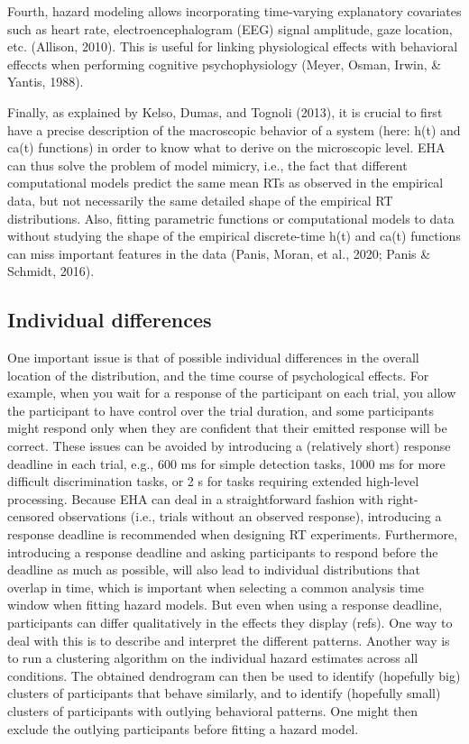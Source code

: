 \documentclass[
  man,floatsintext]{apa6}
\begin{document}
Fourth, hazard modeling allows incorporating time-varying explanatory covariates such as heart rate, electroencephalogram (EEG) signal amplitude, gaze location, etc. (Allison, 2010). This is useful for linking physiological effects with behavioral effeccts when performing cognitive psychophysiology (Meyer, Osman, Irwin, \& Yantis, 1988).

Finally, as explained by Kelso, Dumas, and Tognoli (2013), it is crucial to first have a precise description of the macroscopic behavior of a system (here: h(t) and ca(t) functions) in order to know what to derive on the microscopic level. EHA can thus solve the problem of model mimicry, i.e., the fact that different computational models predict the same mean RTs as observed in the empirical data, but not necessarily the same detailed shape of the empirical RT distributions. Also, fitting parametric functions or computational models to data without studying the shape of the empirical discrete-time h(t) and ca(t) functions can miss important features in the data (Panis, Moran, et al., 2020; Panis \& Schmidt, 2016).

\subsection{Individual differences}\label{individual-differences}

One important issue is that of possible individual differences in the overall location of the distribution, and the time course of psychological effects. For example, when you wait for a response of the participant on each trial, you allow the participant to have control over the trial duration, and some participants might respond only when they are confident that their emitted response will be correct. These issues can be avoided by introducing a (relatively short) response deadline in each trial, e.g., 600 ms for simple detection tasks, 1000 ms for more difficult discrimination tasks, or 2 s for tasks requiring extended high-level processing. Because EHA can deal in a straightforward fashion with right-censored observations (i.e., trials without an observed response), introducing a response deadline is recommended when designing RT experiments. Furthermore, introducing a response deadline and asking participants to respond before the deadline as much as possible, will also lead to individual distributions that overlap in time, which is important when selecting a common analysis time window when fitting hazard models.
But even when using a response deadline, participants can differ qualitatively in the effects they display (refs). One way to deal with this is to describe and interpret the different patterns. Another way is to run a clustering algorithm on the individual hazard estimates across all conditions. The obtained dendrogram can then be used to identify (hopefully big) clusters of participants that behave similarly, and to identify (hopefully small) clusters of participants with outlying behavioral patterns. One might then exclude the outlying participants before fitting a hazard model.
\end{document}
